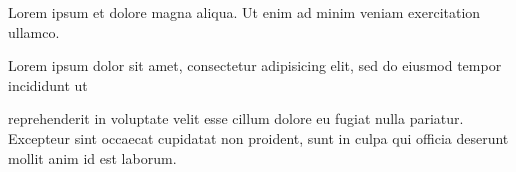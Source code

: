 \documentclass{article}
\begin{document}
Lorem ipsum  et dolore magna aliqua. Ut enim
ad minim veniam exercitation ullamco.

Lorem ipsum dolor sit amet, consectetur adipisicing elit, sed do eiusmod
tempor incididunt ut 

reprehenderit in
voluptate velit esse cillum dolore eu fugiat nulla pariatur. Excepteur
sint occaecat cupidatat non proident, sunt in culpa qui officia deserunt
mollit anim id est laborum.
\end{document}
